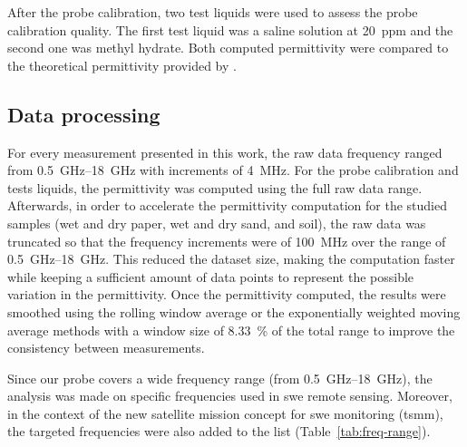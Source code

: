After the probe calibration, two test liquids were used to assess the probe calibration quality.
The first test liquid was a saline solution at \qty{20}{ppm} and the second one was methyl hydrate.
Both computed permittivity were compared to the theoretical permittivity provided by \textcite{Nyshadham1992}.

\subsection{Data processing}\label{subsec:metho-smooth}
For every measurement presented in this work, the raw data frequency ranged from \SIrange{0.5}{18}{\giga\hertz} with increments of \SI{4}{\mega\hertz}. 
For the probe calibration and tests liquids, the permittivity was computed using the full raw data range.
Afterwards, in order to accelerate the permittivity computation for the studied samples (wet and dry paper, wet and dry sand, and soil), the raw data was truncated so that the frequency increments were of \SI{100}{\mega\hertz} over the range of \SIrange{0.5}{18}{\giga\hertz}.
This reduced the dataset size, making the computation faster while keeping a sufficient amount of data points to represent the possible variation in the permittivity.
Once the permittivity computed, the results were smoothed using the rolling window average or the exponentially weighted moving average methods with a window size of \qty{8.33}{\percent} of the total range to improve the consistency between measurements.

Since our probe covers a wide frequency range (from \qtyrange{0.5}{18}{\giga\hertz}), the analysis was made on specific frequencies used in \ac{swe} remote sensing.
Moreover, in the context of the new satellite mission concept for \ac{swe} monitoring (\ac{tsmm}), the targeted frequencies were also added to the list (Table~\ref{tab:freq-range}).

